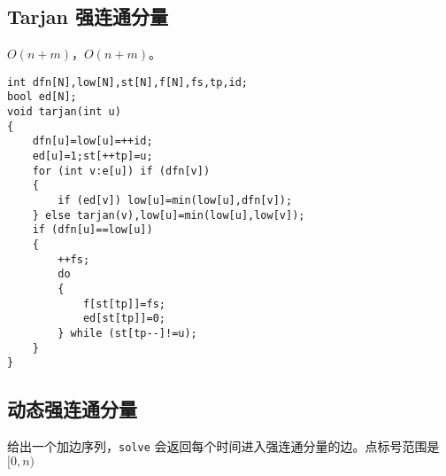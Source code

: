 \documentclass[12pt]{ctexart}
\begin{document}
\subsection{Tarjan 强连通分量}

$O(n+m)$，$O(n+m)$。

\begin{lstlisting}
int dfn[N],low[N],st[N],f[N],fs,tp,id;
bool ed[N];
void tarjan(int u)
{
	dfn[u]=low[u]=++id;
	ed[u]=1;st[++tp]=u;
	for (int v:e[u]) if (dfn[v])
	{
		if (ed[v]) low[u]=min(low[u],dfn[v]);
	} else tarjan(v),low[u]=min(low[u],low[v]);
	if (dfn[u]==low[u])
	{
		++fs;
		do
		{
			f[st[tp]]=fs;
			ed[st[tp]]=0;
		} while (st[tp--]!=u);
	}
}

\end{lstlisting}

\subsection{动态强连通分量}

给出一个加边序列，\verb|solve| 会返回每个时间进入强连通分量的边。点标号范围是 $[0,n)$
\end{document}
